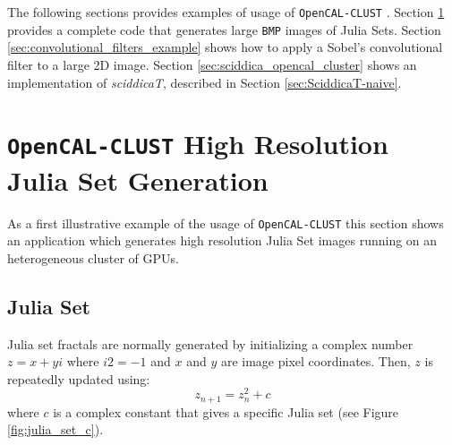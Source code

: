 The following sections provides examples of usage of \texttt{OpenCAL-CLUST} . Section \ref{sec:opencal_julia} provides a complete code that generates large \texttt{BMP} images of Julia Sets.
Section \ref{sec:convolutional_filters_example} shows how to apply a Sobel's convolutional filter to a large 2D image.
Section \ref{sec:sciddica_opencal_cluster} shows an implementation of \textit{sciddicaT}, described in Section \ref{sec:SciddicaT-naive}. 
\section{\texttt{OpenCAL-CLUST}  High Resolution Julia Set Generation}
\label{sec:opencal_julia}
As a first illustrative example of the usage of \texttt{OpenCAL-CLUST}  this section shows an application which generates high resolution Julia Set images running on an heterogeneous cluster of GPUs.

\subsection{Julia Set}
\label{sec:julia_math}
Julia set fractals are normally generated by initializing a complex number  $z = x + yi$  where  $i2 = -1$  and $x$ and $y$ are image pixel coordinates. Then, $z$ is repeatedly updated using:
\[ 
 z_{n+1} = z_n^2 + c
\]  
where $c$ is a complex constant that gives a specific Julia set (see Figure \ref{fig:julia_set_c}).


